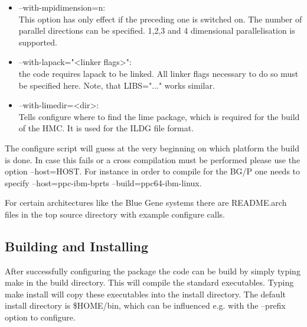 \begin{itemize}
\item {\ttfamily --with-mpidimension=n}:\\
  This option has only effect if the preceding one is switched
  on. The number of parallel directions can be specified. 1,2,3 and 4
  dimensional parallelisation is supported.

\item {\ttfamily --with-lapack="<linker flags>"}:\\
  the code requires lapack to be linked. All linker flags necessary
  to do so must be specified here. Note, that {\ttfamily LIBS="..."}
  works similar.

\item {\ttfamily --with-limedir=<dir>}:\\
  Tells configure where to find the lime package, which is required for
  the build of the HMC. It is used for the ILDG file format.
 
\end{itemize}

The configure script will guess at the very beginning on which
platform the build is done. In case this fails or a cross compilation
must be performed please use the option {\ttfamily --host=HOST}. For
instance in order to compile for the BG/P one needs to specify
{\ttfamily --host=ppc-ibm-bprts --build=ppc64-ibm-linux}. 

For certain architectures like the Blue Gene systems there are
{\ttfamily README.arch} files in the top source directory with
example configure calls.

\subsection{Building and Installing}

After successfully configuring the package the code can be build by
simply typing {\ttfamily make} in the build directory. This will
compile the standard executables. Typing {\ttfamily make install} will
copy these executables into the install directory. The default install
directory is {\ttfamily \$HOME/bin}, which can be influenced e.g. with
the {\ttfamily --prefix} option to {\ttfamily configure}. 


